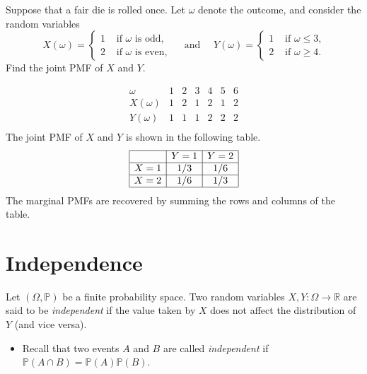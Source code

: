 \documentclass[lecture]{csm}
\newcommand{\R}{\mathbb{R}}
\newcommand{\prob}{\mathbb{P}}
\def\it{\item}
\def\bit{\begin{itemize}}
\def\eit{\end{itemize}}
\begin{document}
\newpage

\begin{example}\label{ex:joint:dice}
Suppose that a fair die is rolled once. Let $\omega$ denote the outcome, and consider the random variables
\[
X(\omega) = \left\{\begin{array}{cl}
	1 & \text{ if $\omega$ is odd,} \\
	2 & \text{ if $\omega$ is even,}
\end{array}\right. 
\quad\mbox{ and }\quad
Y(\omega) = \left\{\begin{array}{cl}
	1 & \text{ if $\omega\leq 3$,} \\
	2 & \text{ if $\omega\geq 4$.}
\end{array}\right.
\]
Find the joint PMF of $X$ and $Y$.
\end{example}

\begin{solution}
\[
\begin{array}{c|cccccc}
\omega 	& 1 & 2 & 3 & 4 & 5 & 6 \\ \hline
X(\omega) 	& 1 & 2 & 1 & 2 & 1 & 2 \\
Y(\omega) 	& 1 & 1 & 1 & 2 & 2 & 2 \\
\end{array}
\]
The joint PMF of $X$ and $Y$ is shown in the following table.
\[
\begin{array}{|c|c|c|} \hline
	& Y=1 	& Y=2 \\ \hline
X=1	& 1/3	& 1/6 \\ \hline
X=2	& 1/6 	& 1/3 \\ \hline
\end{array}
\]
The marginal PMFs are recovered by summing the rows and columns of the table.
\end{solution}

\section{Independence}
Let $(\Omega,\prob)$ be a finite probability space. Two random variables $X,Y:\Omega\to\R$ are said to be \emph{independent} if the value taken by $X$ does not affect the distribution of $Y$ (and vice versa).
\bit
\it Recall that two events $A$ and $B$ are called \emph{independent} if $\prob(A\cap B)=\prob(A)\prob(B)$.
\eit
\end{document}
